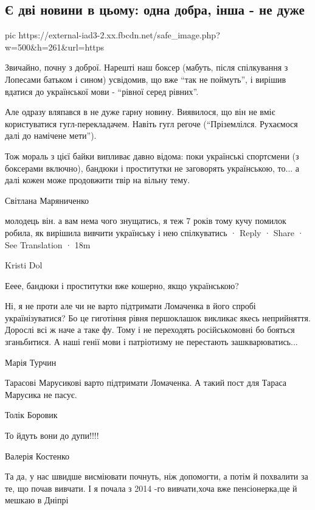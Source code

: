  
 
 
 
 

\subsection{Є дві новини в цьому: одна добра, інша - не дуже}


\ifcmt
  pic https://external-iad3-2.xx.fbcdn.net/safe_image.php?w=500&h=261&url=https%
\fi


Звичайно, почну з доброї. Нарешті наш боксер (мабуть, після спілкування з
Лопесами батьком і сином) усвідомив, що вже \enquote{так не поймуть}, і вирішив
вдатися до української мови - \enquote{рівної серед рівних}.

Але одразу вляпався в не дуже гарну новину. Виявилося, що він не вміє
користуватися гугл-перекладачем. Навіть гугл регоче (\enquote{Пріземлілся. Рухаємося далі до намічене мети}).

Тож мораль з цієї байки випливає давно відома: поки українські спортсмени (з
боксерами включно), бандюки і проститутки не заговорять українською, то... а
далі кожен може продовжити твір на вільну тему.

Світлана Маряниченко

молодець він. а вам нема чого знущатись, я теж 7 років тому кучу помилок
робила, як вирішила вивчити українську і нею спілкуватись · Reply · Share · See
Translation · 18m

Kristi Dol

Ееее, бандюки і проститутки вже кошерно, якщо українською?

Ні, я не проти але чи не варто підтримати Ломаченка в його спробі
українізуватися? Бо це гиготіння рівня першоклашок викликає якесь неприйняття.
Дорослі всі ж наче а таке фу. Тому і не переходять російськомовні бо бояться
зганьбитися. А наші генії мови і патріотизму не перестають зашкварюватись...

Марія Турчин

Тарасові Марусикові варто підтримати Ломаченка. А такий пост для Тараса
Марусика не пасує.  

Толік Боровик

То йдуть вони до дупи!!!!

Валерія Костенко

Та да, у нас швидше висміювати почнуть, ніж допомогти, а потім й похвалити за
те, що почав вивчати. І я почала з 2014 -го вивчати,хоча вже пенсіонерка,ще й
мешкаю в Дніпрі
